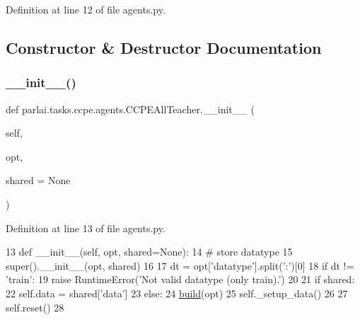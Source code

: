 Definition at line 12 of file agents.\+py.



\subsection{Constructor \& Destructor Documentation}
\mbox{\label{classparlai_1_1tasks_1_1ccpe_1_1agents_1_1CCPEAllTeacher_a7740c7de97e893e02c37bd64eccc3876}} 
\subsubsection{\texorpdfstring{\+\_\+\+\_\+init\+\_\+\+\_\+()}{\_\_init\_\_()}}
{\footnotesize\ttfamily def parlai.\+tasks.\+ccpe.\+agents.\+C\+C\+P\+E\+All\+Teacher.\+\_\+\+\_\+init\+\_\+\+\_\+ (\begin{DoxyParamCaption}\item[{}]{self,  }\item[{}]{opt,  }\item[{}]{shared = {\ttfamily None} }\end{DoxyParamCaption})}



Definition at line 13 of file agents.\+py.


\begin{DoxyCode}
13     \textcolor{keyword}{def }\_\_init\_\_(self, opt, shared=None):
14         \textcolor{comment}{# store datatype}
15         super().\_\_init\_\_(opt, shared)
16 
17         dt = opt[\textcolor{stringliteral}{'datatype'}].split(\textcolor{stringliteral}{':'})[0]
18         \textcolor{keywordflow}{if} dt != \textcolor{stringliteral}{'train'}:
19             \textcolor{keywordflow}{raise} RuntimeError(\textcolor{stringliteral}{'Not valid datatype (only train).'})
20 
21         \textcolor{keywordflow}{if} shared:
22             self.data = shared[\textcolor{stringliteral}{'data'}]
23         \textcolor{keywordflow}{else}:
24             \hyperlink{namespaceparlai_1_1mturk_1_1tasks_1_1talkthewalk_1_1download_a8c0fbb9b6dfe127cb8c1bd6e7c4e33fd}{build}(opt)
25             self.\_setup\_data()
26 
27         self.reset()
28 
\end{DoxyCode}


